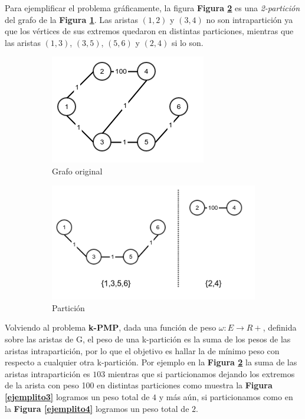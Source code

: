 Para ejemplificar el problema gr\'aficamente, la figura \textbf{Figura \ref{ejemplito2}} es una \textit{2-partici\'on} del grafo de la \textbf{Figura \ref{ejemplito1}}. Las aristas $(1,2)$ y $(3,4)$ no son intrapartici\'on ya que los v\'ertices de sus extremos quedaron en distintas particiones, mientras que las aristas $(1,3)$, $(3,5)$, $(5,6)$ y $(2,4)$ si lo son.


\begin{figure}[H]
	\begin{subfigure}{.5\textwidth}
		\includegraphics[scale=0.6]{intro/ejemplito1.png}
		\caption{Grafo original}
		\label{ejemplito1}
	\end{subfigure}
	\begin{subfigure}{.5\textwidth}
		\centering
		\includegraphics[scale=0.5]{intro/ejemplito2.png}
		\caption{Partici\'on}
		\label{ejemplito2}
	\end{subfigure}
\caption{}
\label{}
\end{figure}

Volviendo al problema \textbf{k-PMP}, dada una funci\'on de peso $\omega : E \rightarrow R+$, definida
sobre las aristas de G, el peso de una k-partici\'on es la suma de los pesos de las aristas intrapartici\'on, por lo que el objetivo es hallar la de m\'inimo peso con respecto a cualquier otra k-partici\'on. Por ejemplo en la \textbf{Figura \ref{ejemplito2}} la suma de las aristas intrapartici\'on es $103$ mientras que si particionamos dejando los extremos de la arista con peso 100 en distintas particiones como muestra la \textbf{Figura \ref{ejemplito3}} logramos un peso total de $4$ y m\'as a\'un, si particionamos como en la \textbf{Figura \ref{ejemplito4}} logramos un peso total de $2$.

